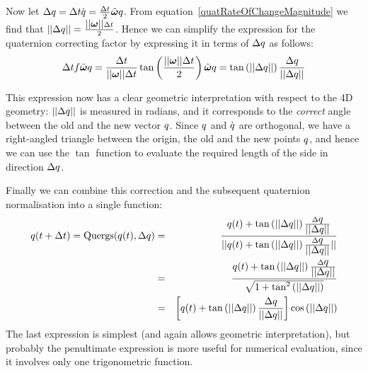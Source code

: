 Now let $\Delta \q{q} = \Delta t \dot{\q{q}} =
    \frac{\Delta t}{2} \tilde{\ve{\omega}} \q{q}$.
From equation~\ref{quatRateOfChangeMagnitude} we find that
$\norm{\Delta\q{q}} = \frac{\norm{\ve{\omega}}\Delta t}{2}$.
Hence we can simplify the expression for the quaternion correcting factor by expressing it
in terms of $\Delta \mbox{$q$}$ as follows:
$$
\Delta t f \tilde{\ve{\omega}}\q{q} = \frac{\Delta t}{\norm{\ve{\omega}}\Delta t}
    \tan\left(\frac{\norm{\ve{\omega}}\Delta t}{2}\right) \tilde{\ve{\omega}} \q{q} =
    \tan\left(\norm{\Delta\q{q}}\right) \frac{\Delta\q{q}}{\norm{\Delta\q{q}}}
$$

This expression now has a clear geometric interpretation with respect to the 4D geometry:
$\mbox{$||\Delta\mbox{$q$}||$}$ is measured in radians, and it corresponds to the {\em correct}
angle between the old and the new vector $\mbox{$q$}$. Since $\mbox{$q$}$ and
$\dot{\mbox{$q$}}$ are orthogonal, we have a right-angled triangle between the origin,
the old and the new points $\mbox{$q$}$, and hence we can use the $\tan$ function to
evaluate the required length of the side in direction $\Delta\mbox{$q$}$.

Finally we can combine this correction and the subsequent quaternion normalisation into
a single function:
\begin{eqnarray*}
\mbox{$q$}(t+\Delta t) = \mathrm{Quergs}(\mbox{$q$}(t), \Delta\mbox{$q$}) &=&
    \frac{\mbox{$q$}(t) + \tan\left(\mbox{$||\Delta\mbox{$q$}||$}\right)
        \frac{\Delta\mbox{$q$}}{\mbox{$||\Delta\mbox{$q$}||$}}}{
    \mbox{$||\mbox{$q$}(t) + \tan\left(\mbox{$||\Delta\mbox{$q$}||$}\right)
        \frac{\Delta\mbox{$q$}}{\mbox{$||\Delta\mbox{$q$}||$}}||$}} \\
&=& \frac{\mbox{$q$}(t) + \tan\left(\mbox{$||\Delta\mbox{$q$}||$}\right)
        \frac{\Delta\mbox{$q$}}{\mbox{$||\Delta\mbox{$q$}||$}}}{
    \sqrt{1 + \tan^2\left(\mbox{$||\Delta\mbox{$q$}||$}\right)}} \\
&=& \left[\mbox{$q$}(t) + \tan\left(\mbox{$||\Delta\mbox{$q$}||$}\right)
        \frac{\Delta\mbox{$q$}}{\mbox{$||\Delta\mbox{$q$}||$}}\right]
    \cos\left(\mbox{$||\Delta\mbox{$q$}||$}\right)
\end{eqnarray*}
The last expression is simplest (and again allows geometric interpretation), but probably
the penultimate expression is more useful for numerical evaluation, since it involves only
one trigonometric function.
